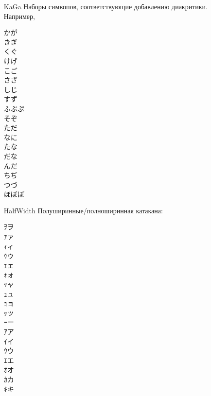 \begin{itemize}
	\item[KaGa] Наборы симвопов, соответствующие добавлению диакритики. Например,
	
	\begin{multicols}{3}
		\begin{CJK}{UTF8}{min}
			かが \\
			きぎ \\
			くぐ \\
			けげ \\
			こご \\
			さざ \\
			しじ \\
			すず \\
			ふぶぷ   \\
			そぞ \\
			ただ \\
			なに \\
			たな \\
			だな \\
			んだ \\
			ちぢ \\
			つづ \\
		ほぼぽ \end{CJK}
	\end{multicols}
	
	\item[HalfWidth] Полуширинные/полноширинная катакана:
	
		\begin{multicols}{3}
		\begin{CJK}{UTF8}{min}
				ｦヲ\\
			ｧァ\\
			ｨィ\\
			ｩゥ\\
			ｪェ\\
			ｫォ\\
			ｬャ\\
			ｭュ\\
			ｮョ\\
			ｯッ\\
			ｰー\\
			ｱア\\
			ｲイ\\
			ｳウ\\
			ｴエ\\
			ｵオ\\
			ｶカ\\
			ｷキ  \end{CJK}
	\end{multicols}
	



\end{itemize}
